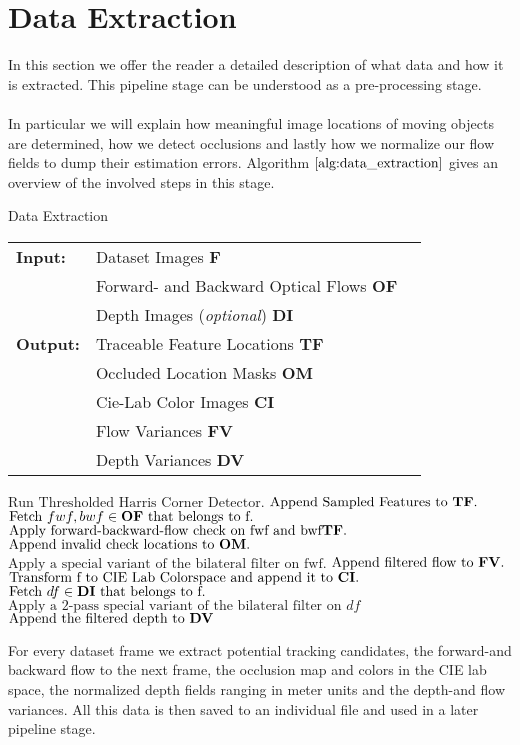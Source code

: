 \section{Data Extraction}
\label{sec:data_extraction}
In this section we offer the reader a detailed description of what data and how it is extracted. This pipeline stage can be understood as a pre-processing stage. \\ \\
In particular we will explain how meaningful image locations of moving objects are determined, how we detect occlusions and lastly how we normalize our flow fields to dump their estimation errors. Algorithm $\ref{alg:data_extraction}$ gives an overview of the involved steps in this stage.
\begin{algorithm}[H]
\caption{Data Extraction}
\begin{table}[H]
  \begin{tabular}{@{}lll@{}}
    \textbf{Input:} & Dataset Images \bf{F} \\
		& Forward- and Backward Optical Flows \bf{OF} \\
 		& Depth Images (\emph{optional}) \bf{DI} \\
    \textbf{Output:} & Traceable Feature Locations \bf{TF} \\
    & Occluded Location Masks \bf{OM}\\
    & Cie-Lab Color Images \bf{CI} \\
    & Flow Variances \bf{FV} \\
    & Depth Variances \bf{DV} \\
    
  \end{tabular} 
\end{table}
\setlength{\fboxrule}{0pt} 
\begin{boxedminipage}{1.0\textwidth}
  \begin{algorithmic}[1]
        \State $\text{Run Thresholded Harris Corner Detector}.$
		\State $\text{Append Sampled Features to } \bf{TF}.$
		\State $\text{Fetch } fwf,bwf \in \bf{OF} \text{ that belongs to f}.$
		\State $\text{Apply forward-backward-flow check on fwf and bwf} \bf{TF}.$
		\State $\text{Append invalid check locations to } \bf{OM}.$
		\State $\text{Apply a special variant of the bilateral filter on fwf}.$
		\State $\text{Append filtered flow to } \bf{FV}.$
		\State $\text{Transform f to CIE Lab Colorspace and append it to } \bf{CI}.$
		\State $\text{Fetch } df \in \bf{DI} \text{ that belongs to f}.$
		\State $\text{Apply a 2-pass special variant of the bilateral filter on } df$
		\State $\text{Append the filtered depth to } \bf{DV}$
      \EndFor
  \end{algorithmic}
  \end{boxedminipage}
  \vskip1.5pt
\label{alg:data_extraction}
\end{algorithm}
For every dataset frame we extract potential tracking candidates, the forward-and backward flow to the next frame, the occlusion map and colors in the CIE lab space, the normalized depth fields ranging in meter units and the depth-and flow variances. All this data is then saved to an individual file and used in a later pipeline stage.
